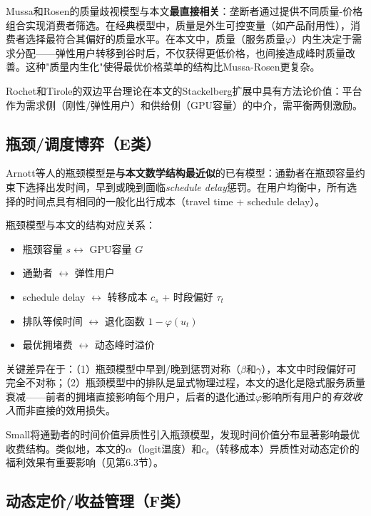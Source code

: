 \documentclass[11pt]{article}
\begin{document}
Mussa和Rosen的质量歧视模型与本文\textbf{最直接相关}：垄断者通过提供不同质量-价格组合实现消费者筛选。在经典模型中，质量是外生可控变量（如产品耐用性），消费者选择最符合其偏好的质量水平。在本文中，质量（服务质量$\varphi$）内生决定于需求分配——弹性用户转移到谷时后，不仅获得更低价格，也间接造成峰时质量改善。这种"质量内生化"使得最优价格菜单的结构比Mussa-Rosen更复杂。

Rochet和Tirole\cite{rochet2003platform}的双边平台理论在本文的Stackelberg扩展中具有方法论价值：平台作为需求侧（刚性/弹性用户）和供给侧（GPU容量）的中介，需平衡两侧激励。

\subsection{瓶颈/调度博弈（E类）}

Arnott等人\cite{arnott1993structure}的瓶颈模型是\textbf{与本文数学结构最近似}的已有模型：通勤者在瓶颈容量约束下选择出发时间，早到或晚到面临\textit{schedule delay}惩罚。在用户均衡中，所有选择的时间点具有相同的一般化出行成本（travel time + schedule delay）。

瓶颈模型与本文的结构对应关系：
\begin{itemize}
  \item 瓶颈容量 $s \leftrightarrow$ GPU容量 $G$
  \item 通勤者 $\leftrightarrow$ 弹性用户
  \item schedule delay $\leftrightarrow$ 转移成本 $c_s$ + 时段偏好 $\tau_t$
  \item 排队等候时间 $\leftrightarrow$ 退化函数 $1-\varphi(u_t)$
  \item 最优拥堵费 $\leftrightarrow$ 动态峰时溢价
\end{itemize}

关键差异在于：（1）瓶颈模型中早到/晚到惩罚对称（$\beta$和$\gamma$），本文中时段偏好可完全不对称；（2）瓶颈模型中的排队是显式物理过程，本文的退化是隐式服务质量衰减——前者的拥堵直接影响每个用户，后者的退化通过$\varphi$影响所有用户的\textit{有效收入}而非直接的效用损失。

Small\cite{small1982scheduling}将通勤者的时间价值异质性引入瓶颈模型，发现时间价值分布显著影响最优收费结构。类似地，本文的$\alpha$（logit温度）和$c_s$（转移成本）异质性对动态定价的福利效果有重要影响（见第6.3节）。

\subsection{动态定价/收益管理（F类）}
\end{document}
